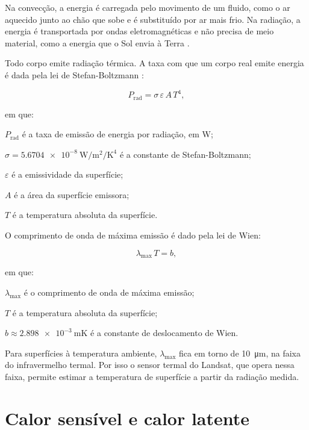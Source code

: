 \documentclass[
12pt,			%
openany,		%
oneside,		%
a4paper,		%
sumario=tradicional,
chapter=TITLE,
section=TITLE,
subsection=Title,
brazil,			%
]{abntex2}
\begin{document}
	Na convecção, a energia é carregada pelo movimento de um fluido, como o ar aquecido junto ao chão que sobe e é substituído por ar mais frio. Na radiação, a energia é transportada por ondas eletromagnéticas e não precisa de meio material, como a energia que o Sol envia à Terra \cite{atmos}.
	
	Todo corpo emite radiação térmica. A taxa com que um corpo real emite energia é dada pela lei de Stefan-Boltzmann \cite{halliday}:
	
	\begin{equation}
		P_{\mathrm{rad}} = \sigma \, \varepsilon \, A \, T^{4},
	\end{equation}
	
	\noindent em que:
	\begin{alineas}
		\item $P_{\mathrm{rad}}$ é a taxa de emissão de energia por radiação, em \si{\watt};
		\item $\sigma = \SI{5.6704e-8}{\watt\per\metre\squared\per\kelvin\tothe{4}}$ é a constante de Stefan-Boltzmann;
		\item $\varepsilon$ é a emissividade da superfície;
		\item $A$ é a área da superfície emissora;
		\item $T$ é a temperatura absoluta da superfície.
	\end{alineas}
	
	O comprimento de onda de máxima emissão é dado pela lei de Wien:
	
	\begin{equation}
		\lambda_{\max} \, T = b,
	\end{equation}
	
	\noindent em que:
	\begin{alineas}
		\item $\lambda_{\max}$ é o comprimento de onda de máxima emissão;
		\item $T$ é a temperatura absoluta da superfície;
		\item $b \approx \SI{2.898e-3}{\metre\kelvin}$ é a constante de deslocamento de Wien.
	\end{alineas}
	
	Para superfícies à temperatura ambiente, $\lambda_{\max}$ fica em torno de \SI{10}{\micro\metre}, na faixa do infravermelho termal. Por isso o sensor termal do Landsat, que opera nessa faixa, permite estimar a temperatura de superfície a partir da radiação medida.
	
	
	\section{Calor sensível e calor latente}
	
\end{document}
